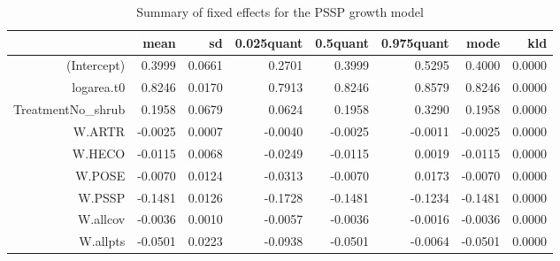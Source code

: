 \begin{table}[ht]
\centering
\caption{Summary of fixed effects for the PSSP growth model} 
\label{PSSPgrowth}
\begin{tabular}{rrrrrrrr}
  \hline
 & mean & sd & 0.025quant & 0.5quant & 0.975quant & mode & kld \\ 
  \hline
(Intercept) & 0.3999 & 0.0661 & 0.2701 & 0.3999 & 0.5295 & 0.4000 & 0.0000 \\ 
  logarea.t0 & 0.8246 & 0.0170 & 0.7913 & 0.8246 & 0.8579 & 0.8246 & 0.0000 \\ 
  TreatmentNo\_shrub & 0.1958 & 0.0679 & 0.0624 & 0.1958 & 0.3290 & 0.1958 & 0.0000 \\ 
  W.ARTR & -0.0025 & 0.0007 & -0.0040 & -0.0025 & -0.0011 & -0.0025 & 0.0000 \\ 
  W.HECO & -0.0115 & 0.0068 & -0.0249 & -0.0115 & 0.0019 & -0.0115 & 0.0000 \\ 
  W.POSE & -0.0070 & 0.0124 & -0.0313 & -0.0070 & 0.0173 & -0.0070 & 0.0000 \\ 
  W.PSSP & -0.1481 & 0.0126 & -0.1728 & -0.1481 & -0.1234 & -0.1481 & 0.0000 \\ 
  W.allcov & -0.0036 & 0.0010 & -0.0057 & -0.0036 & -0.0016 & -0.0036 & 0.0000 \\ 
  W.allpts & -0.0501 & 0.0223 & -0.0938 & -0.0501 & -0.0064 & -0.0501 & 0.0000 \\ 
   \hline
\end{tabular}
\end{table}

